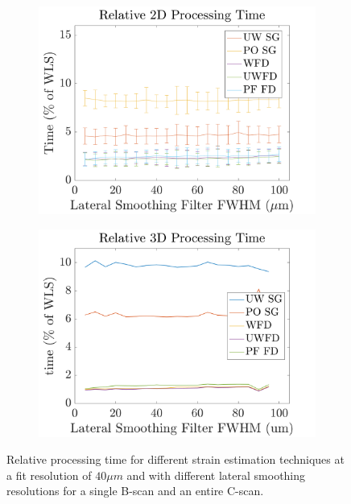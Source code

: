 \begin{figure}[th!]
	\centering
    \begin{subfigure}{0.49\textwidth}
    	\centering
        \includegraphics[width=\textwidth]{figures/2d_relative_lr.png}
    \end{subfigure}
    \begin{subfigure}{0.49\textwidth}
    	\centering
        \includegraphics[width=\textwidth]{figures/3d_relative_lr.png}
    \end{subfigure}
	\caption{Relative processing time for different strain estimation techniques at a fit resolution of $40\mu m$ and with different lateral smoothing resolutions for a single B-scan and an entire C-scan.}
    \label{process_time_2}
\end{figure}

